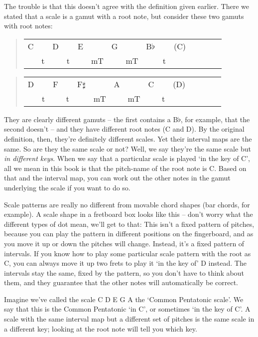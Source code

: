 \documentclass[english]{./gbook}
\begin{document}
\begin{large}
The trouble is that this doesn't agree with the definition given earlier. There we stated that a scale is a gamut with a root note, but consider these two gamuts with root notes:
\begin{quote}
\begin{tabular}{rrrrrrrrrrrrrrr}
	C &&D &&E &&G &&B$\flat$ &&(C)\\
	 &t && t&&mT &&mT &&t &
\end{tabular}
\end{quote}
\begin{quote}
\begin{tabular}{rrrrrrrrrrrrrrr}
	D &&F &&F$\sharp$ &&A &&C &&(D)\\
	 &t && t&&mT &&mT &&t &
\end{tabular}
\end{quote}
They are clearly different gamuts -- the first contains a B$\flat$, for example, that the second doesn't -- and they have different root notes (C and D). By the original definition, then, they're definitely different scales. Yet their interval maps are the same. So are they the same scale or not? Well, we say they're the same scale but \emph{in different keys}. When we say that a particular scale is played `in the key of C', all we mean in this book is that the pitch-name of the root note is C. Based on that and the interval map, you can work out the other notes in the gamut underlying the scale if you want to do so.

Scale patterns are really no different from movable chord shapes (bar chords, for example). A scale shape in a fretboard box looks like this -- don't worry what the different types of dot mean, we'll get to that:
This isn't a fixed pattern of pitches, because you can play the pattern in different positions on the fingerboard, and as you move it up or down the pitches will change. Instead, it's a fixed pattern of intervals. If you know how to play some particular scale pattern with the root as C, you can always move it up two frets to play it `in the key of' D instead. The intervals stay the same, fixed by the pattern, so you don't have to think about them, and they guarantee that the other notes will automatically be correct.

Imagine we've called the scale C D E G A the `Common Pentatonic scale'. We say that this is the Common Pentatonic `in C', or sometimes `in the key of C'. A scale with the same interval map but a different set of pitches is the same scale in a different key; looking at the root note will tell you which key.


\end{large}
\end{document}
